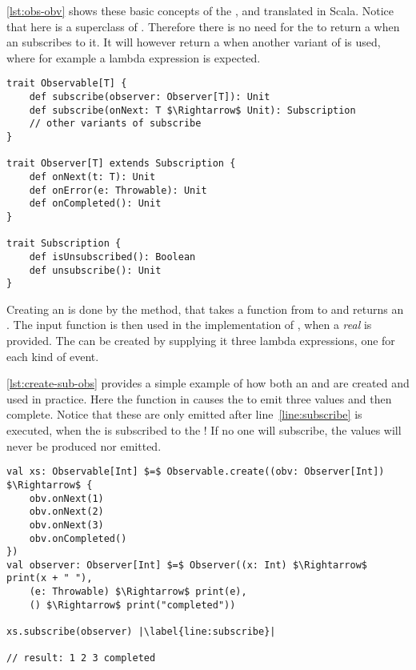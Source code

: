 \autoref{lst:obs-obv} shows these basic concepts of the \obs, \obv and \subs translated in Scala. Notice that here \subs is a superclass of \obv. Therefore there is no need for the \obs to return a \subs when an \obv subscribes to it. It will however return a \subs when another variant of  is used, where for example a lambda expression is expected.

\begin{lstlisting}[caption={Observable, Observer and Subscription}, label={lst:obs-obv}]
trait Observable[T] {
    def subscribe(observer: Observer[T]): Unit
    def subscribe(onNext: T $\Rightarrow$ Unit): Subscription
    // other variants of subscribe
}

trait Observer[T] extends Subscription {
    def onNext(t: T): Unit
    def onError(e: Throwable): Unit
    def onCompleted(): Unit
}

trait Subscription {
    def isUnsubscribed(): Boolean
    def unsubscribe(): Unit
}
\end{lstlisting}

Creating an \obs is done by the  method, that takes a function from \obv to  and returns an \obs. The input function is then used in the implementation of , when a \emph{real} \obv is provided. The \obv can be created by supplying it three lambda expressions, one for each kind of event.

\autoref{lst:create-sub-obs} provides a simple example of how both an \obs and \obv are created and used in practice. Here the function in  causes the \obs to emit three values and then complete. Notice that these are only emitted after line~\ref{line:subscribe} is executed, when the \obv is subscribed to the \obs! If no one will subscribe, the values will never be produced nor emitted.

\begin{lstlisting}[caption={Creating and subscribing to an \obs}, label={lst:create-sub-obs}]
val xs: Observable[Int] $=$ Observable.create((obv: Observer[Int]) $\Rightarrow$ {
    obv.onNext(1)
    obv.onNext(2)
    obv.onNext(3)
    obv.onCompleted()
})
val observer: Observer[Int] $=$ Observer((x: Int) $\Rightarrow$ print(x + " "),
    (e: Throwable) $\Rightarrow$ print(e),
    () $\Rightarrow$ print("completed"))

xs.subscribe(observer) |\label{line:subscribe}|

// result: 1 2 3 completed
\end{lstlisting}

